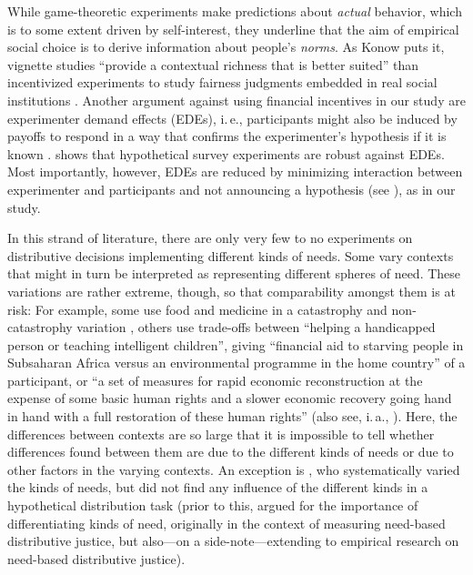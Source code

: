 \documentclass[10pt,letterpaper]{article}
\begin{document}
While game-theoretic experiments make predictions about \textit{actual} behavior, which is to some extent driven by self-interest, they underline that the aim of empirical social choice is to derive information about people's \textit{norms}.
As Konow puts it, vignette studies ``provide a contextual richness that is better suited'' than incentivized experiments to study fairness judgments embedded in real social institutions \cite[p. 109]{konow_is_2009}.
Another argument against using financial incentives in our study are experimenter demand effects (EDEs), i.\,e., participants might also be induced by payoffs to respond in a way that confirms the experimenter's hypothesis if it is known \cite{zizzo_experimenter_2010}.
\cite{mummolo_demand_2019} shows that hypothetical survey experiments are robust against EDEs.
Most importantly, however, EDEs are reduced by minimizing interaction between experimenter and participants and not announcing a hypothesis (see \cite{de_quidt_measuring_2018}), as in our study.

In this strand of literature, there are only very few to no experiments on distributive decisions implementing different kinds of needs.
Some vary contexts that might in turn be interpreted as representing different spheres of need.
These variations are rather extreme, though, so that comparability amongst them is at risk: For example, some use food and medicine in a catastrophy and non-catastrophy variation \cite{scott_whats_2009}, others use trade-offs between ``helping a handicapped person or teaching intelligent children'', giving ``financial aid to starving people in Subsaharan Africa versus an environmental programme in the home country'' of a participant, or ``a set of measures for rapid economic reconstruction at the expense of some basic human rights and a slower economic recovery going hand in hand with a full restoration of these human rights'' \cite[p. 630]{gaertner_equity_2007} (also see, i.\,a., \cite{konow_fair_2001,konow_which_2003,schwettmann_trading_2009}).
Here, the differences between contexts are so large that it is impossible to tell whether differences found between them are due to the different kinds of needs or due to other factors in the varying contexts.
An exception is \cite{bauer_needs_forthcoming}, who systematically varied the kinds of needs, but did not find any influence of the different kinds in a hypothetical distribution task (prior to this, \cite{bauer_sated_2018,bauer_sated_2022} argued for the importance of differentiating kinds of need, originally in the context of measuring need-based distributive justice, but also---on a side-note---extending to empirical research on need-based distributive justice).
\end{document}
